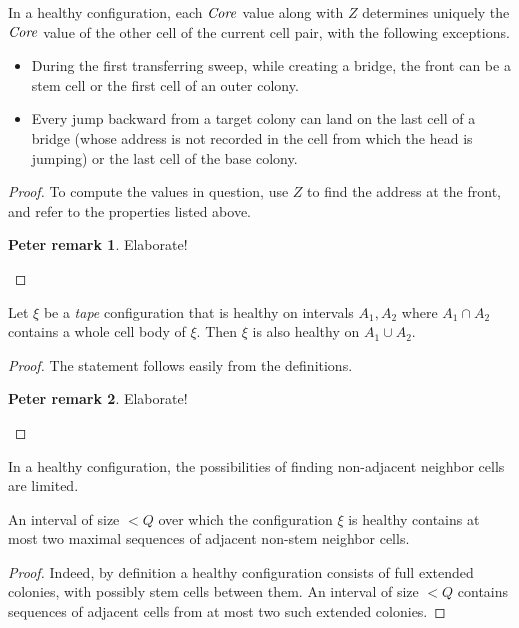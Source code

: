 \documentclass[11pt]{memoir}
\newcommand{\authnote}[3]
{\text{{ \textcolor{#3}{\( \langle\hspace{-0.2em}\langle \)\textsf{\footnotesize #1: #2}\( \rangle\hspace{-0.2em}\rangle \)}}}}
\newcommand{\authnote}[2]{}
\newcommand{\Pnote}[1]{{\authnote{P}{#1}{cyan}}}
\theoremstyle{definition} %
\newtheorem{Premark}{\color{cyan}Peter remark}
\newenvironment{premark}{\begin{Premark}\color{cyan}}{\varqed\end{Premark}}
\renewcommand{\Pnote}[1]{\begin{premark}#1\end{premark}}
\newcommand{\fld}[1]{\ensuremath{\textit{#1\/}}}
\newcommand{\Q}{Q}
\newcommand{\Z}{Z}
\newcommand{\Core}{\fld{Core}}
\begin{document}
\begin{lemma}\label{lem:coordination1}
  In a healthy configuration, each \( \Core \) 
  value along with \( \Z \) determines uniquely the 
  \( \Core \) value of the other cell of the current cell pair, with the following exceptions.
  \begin{itemize}
  \item During the first transferring sweep, while
    creating a bridge, the front can be a stem cell or the first cell of an outer colony.
  \item Every jump backward from a target colony can land on the last cell of a 
    bridge (whose address is not recorded in the cell from which the head is jumping)
    or the last cell of the base colony.
  \end{itemize}
  \end{lemma}
  \begin{proof}
  To compute the values in question, use \( \Z \) to find the address at the front, and
  refer to the properties listed above.
\Pnote{Elaborate!}    
  \end{proof}

\begin{lemma}\label{lem:health-extension}
  Let \( \xi \) be a \emph{tape} configuration that is healthy on intervals \( A_{1}, A_{2} \) 
where \( A_{1}\cap A_{2} \) contains a whole cell body of \( \xi \).
Then \( \xi \) is also healthy on \( A_{1}\cup A_{2} \).
\end{lemma}
\begin{proof}
  The statement follows easily from the definitions.
\Pnote{Elaborate!}    
\end{proof}

In a healthy configuration, the possibilities of finding non-adjacent neighbor
cells are limited.

\begin{lemma}\label{lem:two-domains}
  An interval of size \( <\Q \) over which the configuration \( \xi \) is healthy
contains at most two maximal sequences of adjacent non-stem neighbor cells.
\end{lemma}
\begin{proof}
Indeed, by definition a healthy configuration consists of full extended colonies, with 
possibly stem cells between them.
An interval of size \( <\Q \) contains sequences of adjacent cells 
from at most two such extended colonies.
\end{proof}

\end{document}
